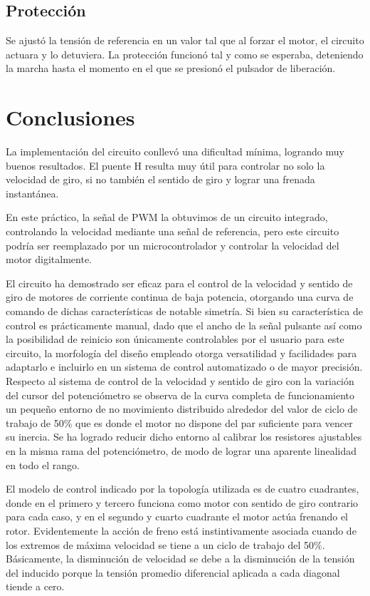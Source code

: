 \documentclass[11pt, a4paper]{article}
\begin{document}
  
\subsection{Protección}
Se ajustó la tensión de referencia en un valor tal que al forzar el motor, el circuito actuara y lo detuviera. La protección funcionó tal y como se esperaba, deteniendo la marcha hasta el momento en el que se presionó el pulsador de liberación.


\section{Conclusiones}
La implementación del circuito conllevó una dificultad mínima, logrando muy buenos resultados. El puente H resulta muy útil para controlar no solo la velocidad de giro, si no también el sentido de giro y lograr una frenada instantánea.

En este práctico, la señal de PWM la obtuvimos de un circuito integrado, controlando la velocidad mediante una señal de referencia, pero este circuito podría ser reemplazado por un microcontrolador y controlar la velocidad del motor digitalmente.

El circuito ha demostrado ser eficaz para el control de la velocidad y sentido de giro de motores de corriente continua de baja potencia, otorgando una curva de comando de dichas características de notable simetría. Si bien su característica de control es prácticamente manual, dado que el ancho de la señal pulsante así como la posibilidad de reinicio son únicamente controlables por el usuario para este circuito, la morfología del diseño empleado otorga versatilidad y facilidades para adaptarlo e incluirlo en un sistema de control automatizado o de mayor precisión.
Respecto al sistema de control de la velocidad y sentido de giro con la variación del cursor del  potenciómetro se observa de la curva completa de funcionamiento un pequeño entorno de no movimiento distribuido alrededor del valor de ciclo de trabajo de 50\% que es donde el motor no dispone del par suficiente para vencer su inercia. Se ha logrado reducir dicho entorno al calibrar los resistores ajustables en la misma rama del potenciómetro, de modo de lograr una aparente linealidad en todo el rango.

El modelo de control indicado por la topología utilizada es de cuatro cuadrantes, donde en el primero y tercero funciona como motor con sentido de giro contrario para cada caso, y en el segundo y cuarto cuadrante el motor actúa frenando el rotor. Evidentemente la acción de freno está instintivamente asociada cuando de los extremos de máxima velocidad se tiene a un ciclo de trabajo del 50\%. Básicamente, la disminución de velocidad se debe a la disminución de la tensión del inducido porque la tensión promedio diferencial aplicada a cada diagonal tiende a cero.
\end{document}
